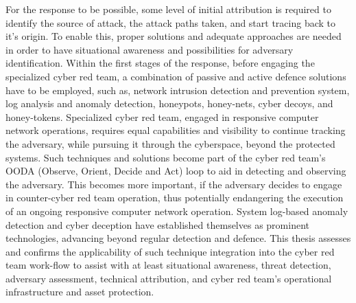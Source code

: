 For the response to be possible, some level of initial attribution is required to identify the source of attack, the attack paths taken, and start tracing back to it's origin. To enable this, proper solutions and adequate approaches are needed in order to have situational awareness and possibilities for adversary identification. Within the first stages of the response, before engaging the specialized cyber red team, a combination of passive and active defence solutions have to be employed, such as, network intrusion detection and prevention system, log analysis and anomaly detection, honeypots, honey-nets, cyber decoys, and honey-tokens. Specialized cyber red team, engaged in responsive computer network operations, requires equal capabilities and visibility to continue tracking the adversary, while pursuing it through the cyberspace, beyond the protected systems. Such techniques and solutions become part of the cyber red team's OODA (Observe, Orient, Decide and Act) loop to aid in detecting and observing the adversary. This becomes more important, if the adversary decides to engage in counter-cyber red team operation, thus potentially endangering the execution of an ongoing responsive computer network operation. System log-based anomaly detection and cyber deception have established themselves as prominent technologies, advancing beyond regular detection and defence. This thesis assesses and confirms the applicability of such technique integration into the cyber red team work-flow to assist with at least situational awareness, threat detection, adversary assessment, technical attribution, and cyber red team's operational infrastructure and asset protection.


